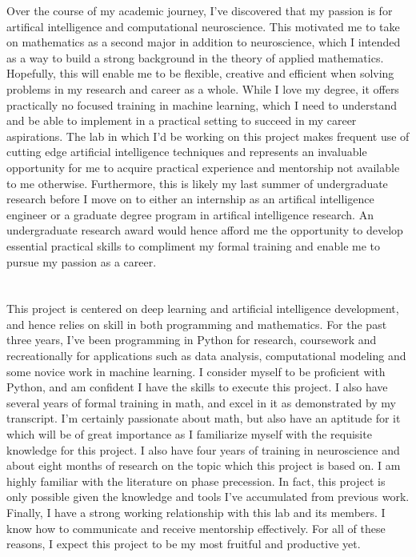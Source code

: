 \documentclass[12pt, letterpaper]{article}
\begin{document}
Over the course of my academic journey, I’ve discovered that my passion is for artifical intelligence and computational neuroscience. This motivated me to take on mathematics as a second major in addition to neuroscience, which I intended as a way to build a strong background in the theory of applied mathematics. Hopefully, this will enable me to be flexible, creative and efficient when solving problems in my research and career as a whole. While I love my degree, it offers practically no focused training in machine learning, which I need to understand and be able to implement in a practical setting to succeed in my career aspirations. The lab in which I’d be working on this project makes frequent use of cutting edge artificial intelligence techniques and represents an invaluable opportunity for me to acquire practical experience and mentorship not available to me otherwise. Furthermore, this is likely my last summer of undergraduate research before I move on to either an internship as an artifical intelligence engineer or a graduate degree program in artifical intelligence research. An undergraduate research award would hence afford me the opportunity to develop essential practical skills to compliment my formal training and enable me to pursue my passion as a career.\\

\\
\\

This project is centered on deep learning and artificial intelligence development, and hence relies on skill in both programming and mathematics. For the past three years, I’ve been programming in Python for research, coursework and recreationally for applications such as data analysis, computational modeling and some novice work in machine learning. I consider myself to be proficient with Python, and am confident I have the skills to execute this project. I also have several years of formal training in math, and excel in it as demonstrated by my transcript. I’m certainly passionate about math, but also have an aptitude for it which will be of great importance as I familiarize myself with the requisite knowledge for this project. I also have four years of training in neuroscience and about eight months of research on the topic which this project is based on. I am highly familiar with the literature on phase precession. In fact, this project is only possible given the knowledge and tools I’ve accumulated from previous work. Finally, I have a strong working relationship with this lab and its members. I know how to communicate and receive mentorship effectively. For all of these reasons, I expect this project to be my most fruitful and productive yet. 
\end{document}

